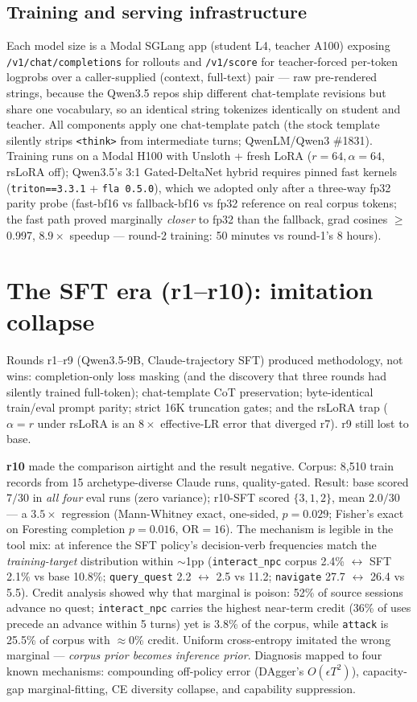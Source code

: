 \documentclass[11pt]{article}
\begin{document}
\subsection{Training and serving infrastructure}
Each model size is a Modal SGLang app (student L4, teacher A100) exposing
\texttt{/v1/chat/completions} for rollouts and \texttt{/v1/score} for teacher-forced per-token
logprobs over a caller-supplied (context, full-text) pair --- raw pre-rendered strings, because
the Qwen3.5 repos ship different chat-template revisions but share one vocabulary, so an identical
string tokenizes identically on student and teacher. All components apply one chat-template patch
(the stock template silently strips \texttt{<think>} from intermediate turns; QwenLM/Qwen3
\#1831). Training runs on a Modal H100 with Unsloth + fresh LoRA ($r{=}64,\alpha{=}64$,
rsLoRA off); Qwen3.5's 3:1 Gated-DeltaNet hybrid requires pinned fast kernels
(\texttt{triton==3.3.1} + \texttt{fla 0.5.0}), which we adopted only after a three-way fp32
parity probe (fast-bf16 vs fallback-bf16 vs fp32 reference on real corpus tokens; the fast path
proved marginally \emph{closer} to fp32 than the fallback, grad cosines $\ge$0.997, $8.9\times$
speedup --- round-2 training: 50 minutes vs round-1's 8 hours).

\section{The SFT era (r1--r10): imitation collapse}

Rounds r1--r9 (Qwen3.5-9B, Claude-trajectory SFT) produced methodology, not wins: completion-only
loss masking (and the discovery that three rounds had silently trained full-token);
chat-template CoT preservation; byte-identical train/eval prompt parity; strict 16K truncation
gates; and the rsLoRA trap ($\alpha{=}r$ under rsLoRA is an $8\times$ effective-LR error that
diverged r7). r9 still lost to base.

\textbf{r10} made the comparison airtight and the result negative. Corpus: 8{,}510 train records
from 15 archetype-diverse Claude runs, quality-gated. Result: base scored $7/30$ in \emph{all
four} eval runs (zero variance); r10-SFT scored $\{3,1,2\}$, mean $2.0/30$ --- a $3.5\times$
regression (Mann-Whitney exact, one-sided, $p{=}0.029$; Fisher's exact on Foresting completion
$p{=}0.016$, OR$=16$). The mechanism is legible in the tool mix: at inference the SFT policy's
decision-verb frequencies match the \emph{training-target} distribution within $\sim$1pp
(\texttt{interact\_npc} corpus 2.4\% $\leftrightarrow$ SFT 2.1\% vs base 10.8\%;
\texttt{query\_quest} 2.2 $\leftrightarrow$ 2.5 vs 11.2; \texttt{navigate} 27.7 $\leftrightarrow$
26.4 vs 5.5). Credit analysis showed why that marginal is poison: 52\% of source sessions advance
no quest; \texttt{interact\_npc} carries the highest near-term credit (36\% of uses precede an
advance within 5 turns) yet is 3.8\% of the corpus, while \texttt{attack} is 25.5\% of corpus
with $\approx$0\% credit. Uniform cross-entropy imitated the wrong marginal --- \emph{corpus
prior becomes inference prior}. Diagnosis mapped to four known mechanisms: compounding
off-policy error (DAgger's $O(\epsilon T^2)$), capacity-gap marginal-fitting, CE diversity
collapse, and capability suppression.
\end{document}
